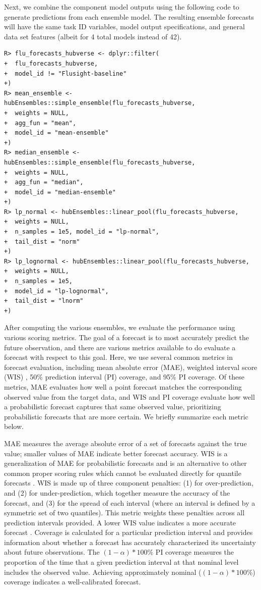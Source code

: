 \documentclass[
  article,
  shortnames,
  notitle]{jss}
\begin{document}
Next, we combine the component model outputs using the following code to
generate predictions from each ensemble model. The resulting ensemble
forecasts will have the same task ID variables, model output
specifications, and general data set features (albeit for 4 total models
instead of 42).

\begin{verbatim}
R> flu_forecasts_hubverse <- dplyr::filter(
+  flu_forecasts_hubverse,
+  model_id != "Flusight-baseline"
+)
R> mean_ensemble <- hubEnsembles::simple_ensemble(flu_forecasts_hubverse,
+  weights = NULL,
+  agg_fun = "mean",
+  model_id = "mean-ensemble"
+)
R> median_ensemble <- hubEnsembles::simple_ensemble(flu_forecasts_hubverse,
+  weights = NULL,
+  agg_fun = "median",
+  model_id = "median-ensemble"
+)
R> lp_normal <- hubEnsembles::linear_pool(flu_forecasts_hubverse,
+  weights = NULL,
+  n_samples = 1e5, model_id = "lp-normal",
+  tail_dist = "norm"
+)
R> lp_lognormal <- hubEnsembles::linear_pool(flu_forecasts_hubverse,
+  weights = NULL,
+  n_samples = 1e5,
+  model_id = "lp-lognormal",
+  tail_dist = "lnorm"
+)
\end{verbatim}

After computing the various ensembles, we evaluate the performance using
various scoring metrics. The goal of a forecast is to most accurately
predict the future observation, and there are various metrics available
to do evaluate a forecast with respect to this goal. Here, we use
several common metrics in forecast evaluation, including mean absolute
error (MAE), weighted interval score (WIS)
\citep{bracher_evaluating_2021}, 50\% prediction interval (PI) coverage,
and 95\% PI coverage. Of these metrics, MAE evaluates how well a point
forecast matches the corresponding observed value from the target data,
and WIS and PI coverage evaluate how well a probabilistic forecast
captures that same observed value, prioritizing probabilistic forecasts
that are more certain. We briefly summarize each metric below.

MAE measures the average absolute error of a set of forecasts against
the true value; smaller values of MAE indicate better forecast accuracy.
WIS is a generalization of MAE for probabilistic forecasts and is an
alternative to other common proper scoring rules which cannot be
evaluated directly for quantile forecasts
\citep{bracher_evaluating_2021}. WIS is made up of three component
penalties: (1) for over-prediction, and (2) for under-prediction, which
together measure the accuracy of the forecast, and (3) for the spread of
each interval (where an interval is defined by a symmetric set of two
quantiles). This metric weights these penalties across all prediction
intervals provided. A lower WIS value indicates a more accurate forecast
\citep{bracher_evaluating_2021}. Coverage is calculated for a particular
prediction interval and provides information about whether a forecast
has accurately characterized its uncertainty about future observations.
The \((1-\alpha)*100\)\% PI coverage measures the proportion of the time
that a given prediction interval at that nominal level includes the
observed value. Achieving approximately nominal (\((1-\alpha)*100\)\%)
coverage indicates a well-calibrated forecast.
\end{document}
